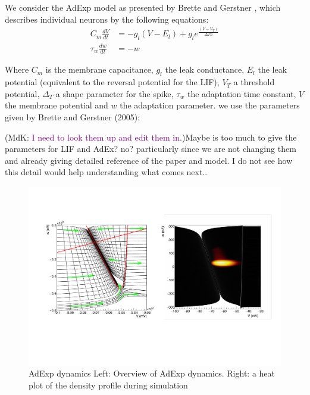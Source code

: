 \documentclass[10pt]{article}
\newcommand{\noteMdK}[2]{(MdK: \textcolor{purple}{#1})}
\newcommand{\noteMP}[3]{(MP: \textcolor{blue}{#1})}
\begin{document}
We consider the AdExp model as presented by Brette and Gerstner \cite{brette2005}, which describes individual neurons by the following equations:
\begin{align}
  C_m \frac{dV}{dt}    & =  -g_l(V - E_l)  + g_l e^{ \frac{(V - V_T)}{\Delta Th}} \\
  \tau_w \frac{dw}{dt} & =  -w \nonumber
\end{align}

Where $C_m$ is the membrane capacitance, $g_l$ the leak conductance, $E_l$ the leak potential (equivalent to the reversal potential for the LIF), $V_T$ a threshold potential, $\Delta_T$ a shape parameter for the spike, $\tau_w$ the adaptation time constant, $V$ the membrane potential and $w$ the adaptation parameter.
we use the parameters given by Brette and Gerstner (2005):

\noteMdK{I need to look them up and edit them in.}

\noteMP{Maybe is too much to give the parameters for LIF and AdEx? no? particularly since we are not changing them and already giving detailed reference of the paper and model. I do not see how this detail would help understanding what comes next.}.

\begin{figure}[h!]
  \begin{center}
    \includegraphics[width=1.0\columnwidth]{aexp_overview.pdf}
    \caption{{AdExp dynamics {\label{fig-adexp}} Left: Overview of AdExp dynamics.
        Right: a heat plot of the density profile during simulation%
      }}
  \end{center}
\end{figure}
\end{document}
